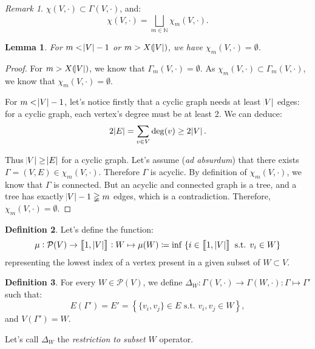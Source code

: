 \documentclass{article}
\newtheorem{lemma}{Lemma}[section]
\theoremstyle{definition}
\newtheorem{definition}[lemma]{Definition}
\theoremstyle{remark}
\newtheorem*{remark}{Remark}
\newcommand{\N}{\mathbb N}
\newcommand{\intint}[2]{\left\llbracket#1, \, #2\right\rrbracket}
\newcommand{\st}{\text{ s.t. }}
\begin{document}
		\begin{remark} $\chi(V, \cdot) \subset \Gamma(V, \cdot)$, and:
		\[\chi(V, \cdot) = \bigsqcup_{m \in \N}\chi_m(V, \cdot).\]
		\end{remark}

		\begin{lemma} For $m < \abs V-1$ or $m > X(\abs V)$, we have $\chi_m(V, \cdot) = \emptyset$.
		\end{lemma}

		\begin{proof} For $m > X(\abs V)$, we know that $\Gamma_m(V, \cdot) = \emptyset$. As $\chi_m(V, \cdot) \subset \Gamma_m(V, \cdot)$, we know that
		$\chi_m(V, \cdot) = \emptyset$.

		For $m < \abs V-1$, let's notice firstly that a cyclic graph needs at least $\abs V$ edges: for a cyclic graph, each vertex's degree must be at least 2. We
		can deduce:
		\[2\abs E = \sum_{v \in V}\deg(v) \geq 2\abs V.\]

		Thus $\abs V \geq \abs E$ for a cyclic graph. Let's assume (\textit{ad absurdum}) that there exists $\Gamma = (V, E) \in \chi_m(V, \cdot)$. Therefore $\Gamma$ is acyclic.
		By definition of $\chi_m(V, \cdot)$, we know that $\Gamma$ is connected. But an acyclic and connected graph is a tree, and a tree has exactly
		$\abs V-1 \gneqq m$ edges, which is a contradiction. Therefore, $\chi_m(V, \cdot) = \emptyset$.
		\end{proof}

		\begin{definition}\label{def:mu function} Let's define the function:
		\[\mu : \mathcal P(V) \to \intint 1{\abs V} : W \mapsto \mu(W) \coloneqq \inf\; \{i \in \intint 1{\abs V} \st v_i \in W\}\]
		representing the lowest index of a vertex present in a given subset of $W \subset V$.
		\end{definition}

		\begin{definition} For every $W \in \mathcal P(V)$, we define $\Delta_W : \Gamma(V, \cdot) \to \Gamma(W, \cdot) : \Gamma \mapsto \Gamma'$
		such that:
		\[E(\Gamma') = E' = \left\{\{v_i, v_j\} \in E \st v_i, v_j \in W\right\},\]
		and $V(\Gamma') = W$.

		Let's call $\Delta_W$ the \textit{restriction to subset $W$} operator.
		\end{definition}
\end{document}
